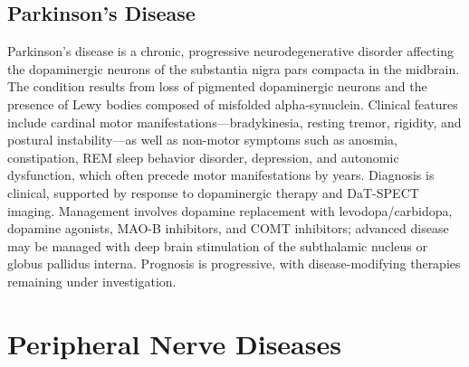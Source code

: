 \subsection{Parkinson's Disease}
\label{sec:Parkinson's Disease}
Parkinson's disease is a chronic, progressive neurodegenerative disorder affecting the dopaminergic neurons of the substantia nigra pars compacta in the midbrain. The condition results from loss of pigmented dopaminergic neurons and the presence of Lewy bodies composed of misfolded alpha-synuclein. Clinical features include cardinal motor manifestations---bradykinesia, resting tremor, rigidity, and postural instability---as well as non-motor symptoms such as anosmia, constipation, REM sleep behavior disorder, depression, and autonomic dysfunction, which often precede motor manifestations by years. Diagnosis is clinical, supported by response to dopaminergic therapy and DaT-SPECT imaging. Management involves dopamine replacement with levodopa/carbidopa, dopamine agonists, MAO-B inhibitors, and COMT inhibitors; advanced disease may be managed with deep brain stimulation of the subthalamic nucleus or globus pallidus interna. Prognosis is progressive, with disease-modifying therapies remaining under investigation.

\section{Peripheral Nerve Diseases}








\label{sec:Peripheral Nerve Diseases}

